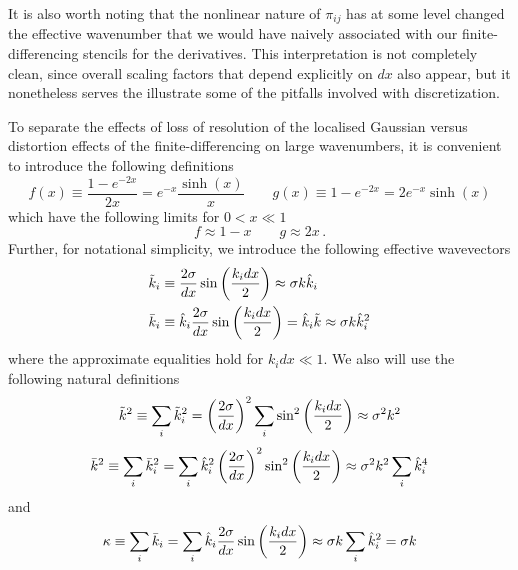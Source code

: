 \documentclass{revtex4}
\begin{document}
It is also worth noting that the nonlinear nature of $\pi_{ij}$ has at some level changed the effective wavenumber that we would have naively associated with our finite-differencing stencils for the derivatives.  This interpretation is not completely clean, since overall scaling factors that depend explicitly on $dx$ also appear, but it nonetheless serves the illustrate some of the pitfalls involved with discretization.

To separate the effects of loss of resolution of the localised Gaussian versus distortion effects of the finite-differencing on large wavenumbers, it is convenient to introduce the following definitions
\begin{equation}
  f(x) \equiv \frac{1-e^{-2x}}{2x} = e^{-x}\frac{\sinh(x)}{x} \qquad g(x) \equiv 1-e^{-2x} = 2e^{-x}\sinh(x)
\end{equation}
which have the following limits for $0 < x \ll 1$
\begin{equation}
  f \approx 1-x \qquad g \approx 2x \, .
\end{equation}
Further, for notational simplicity, we introduce the following effective wavevectors
\begin{subequations}
\begin{align}
  \tilde{k}_i &\equiv \frac{2\sigma}{dx}\sin\left(\frac{k_idx}{2}\right) \approx \sigma k\hat{k}_i \\
  \bar{k}_i &\equiv \hat{k}_i\frac{2\sigma}{dx}\sin\left(\frac{k_idx}{2}\right) = \hat{k}_i\tilde{k} \approx \sigma k\hat{k}_i^2
\end{align}
\end{subequations}
where the approximate equalities hold for $k_idx \ll 1$.
We also will use the following natural definitions
\begin{equation}
  \tilde{k}^2 \equiv \sum_i\tilde{k}_i^2 = \left(\frac{2\sigma}{dx}\right)^2\sum_i\sin^2\left(\frac{k_idx}{2}\right) \approx \sigma^2k^2
\end{equation}
\begin{equation}
  \bar{k}^2 \equiv \sum_i\bar{k}_i^2 = \sum_i \hat{k}_i^2\left(\frac{2\sigma}{dx}\right)^2\sin^2\left(\frac{k_idx}{2}\right) \approx \sigma^2k^2\sum_i\hat{k}_i^4
\end{equation}
and
\begin{equation}
  \kappa \equiv \sum_i\bar{k}_i = \sum_i\hat{k}_i\frac{2\sigma}{dx}\sin\left(\frac{k_idx}{2}\right) \approx \sigma k\sum_i\hat{k}_i^2 = \sigma k
\end{equation}
\end{document}
